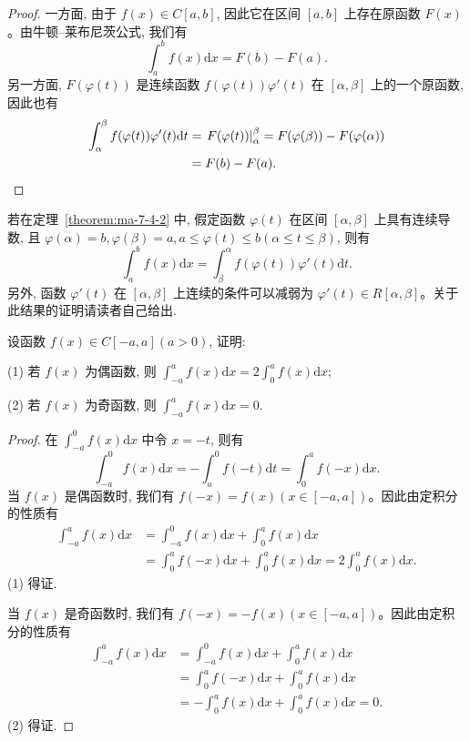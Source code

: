 \begin{proof}
一方面, 由于 $f(x)\in C[a,b]$, 因此它在区间 $[a,b]$ 上存在原函数 $F(x)$。由牛顿--莱布尼茨公式, 我们有
\[
  \int_a^b f(x)\mathrm dx=F(b)-F(a).
\]
另一方面, $F(\varphi(t))$ 是连续函数 $f(\varphi(t))\varphi'(t)$ 在 $[\alpha,\beta]$ 上的一个原函数, 因此也有
\[
\begin{aligned}
  \int_\alpha^\beta f(\varphi(t))\varphi'(t)\mathrm dt
  &=\left.F(\varphi(t))\right|_\alpha^\beta
  =F(\varphi(\beta))-F(\varphi(\alpha))\\
  &=F(b)-F(a).
\end{aligned}
\qedhere
\]
\end{proof}


\begin{remark}\label{remark:ma-7-source-58}
若在定理~\ref{theorem:ma-7-4-2} 中, 假定函数 $\varphi(t)$ 在区间 $[\alpha,\beta]$ 上具有连续导数, 且 $\varphi(\alpha)=b,\varphi(\beta)=a,a\leq\varphi(t)\leq b(\alpha\leq t\leq\beta)$, 则有
\[
  \int_a^b f(x)\mathrm dx=\int_\beta^\alpha f(\varphi(t))\varphi'(t)\mathrm dt.
\]
另外, 函数 $\varphi'(t)$ 在 $[\alpha,\beta]$ 上连续的条件可以减弱为 $\varphi'(t)\in R[\alpha,\beta]$。关于此结果的证明请读者自己给出.
\end{remark}


\begin{example}\label{example:ma-7-4-4}
设函数 $f(x)\in C[-a,a](a>0)$, 证明:

(1) 若 $f(x)$ 为偶函数, 则 $\int_{-a}^a f(x)\mathrm dx=2\int_0^a f(x)\mathrm dx$;

(2) 若 $f(x)$ 为奇函数, 则 $\int_{-a}^a f(x)\mathrm dx=0$.
\end{example}


\begin{proof}
在 $\int_{-a}^0 f(x)\mathrm dx$ 中令 $x=-t$, 则有
\[
  \int_{-a}^0 f(x)\mathrm dx=-\int_a^0 f(-t)\mathrm dt=\int_0^a f(-x)\mathrm dx.
\]
当 $f(x)$ 是偶函数时, 我们有 $f(-x)=f(x)(x\in[-a,a])$。因此由定积分的性质有
\[
\begin{aligned}
  \int_{-a}^a f(x)\mathrm dx
  &=\int_{-a}^0 f(x)\mathrm dx+\int_0^a f(x)\mathrm dx\\
  &=\int_0^a f(-x)\mathrm dx+\int_0^a f(x)\mathrm dx
  =2\int_0^a f(x)\mathrm dx.
\end{aligned}
\]
(1) 得证.

当 $f(x)$ 是奇函数时, 我们有 $f(-x)=-f(x)(x\in[-a,a])$。因此由定积分的性质有
\[
\begin{aligned}
  \int_{-a}^a f(x)\mathrm dx
  &=\int_{-a}^0 f(x)\mathrm dx+\int_0^a f(x)\mathrm dx\\
  &=\int_0^a f(-x)\mathrm dx+\int_0^a f(x)\mathrm dx\\
  &=-\int_0^a f(x)\mathrm dx+\int_0^a f(x)\mathrm dx=0.
\end{aligned}
\]
(2) 得证.
\end{proof}


